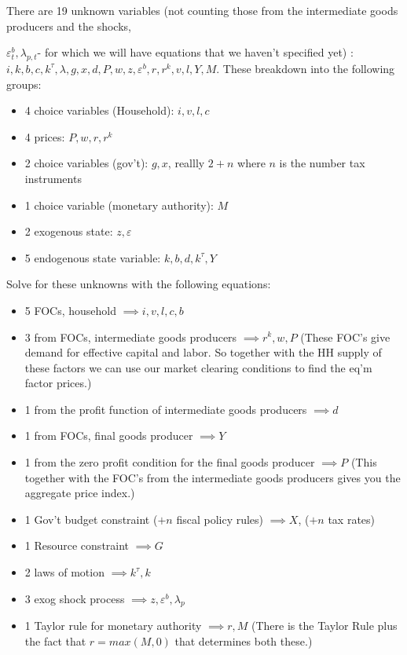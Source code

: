 \documentclass[article,11pt,letterpaper,fleqn]{article}
\theoremstyle{definition}
\numberwithin{equation}{section}
\begin{document}
There are 19 unknown variables (not counting those from the intermediate goods producers and the shocks, {$\varepsilon_{t}^{b},\lambda_{p,t}$- for which we will have equations that we haven't specified yet) : $i, k, b, c, k^{\tau}, \lambda, g, x, d, P, w, z, \varepsilon^{b}, r, r^{k}, v, l, Y, M$.  These breakdown into the following groups:
\begin{itemize}
\item 4 choice variables (Household): $i,v,l,c$
\item 4 prices: $P,w,r,r^{k}$
\item 2 choice variables (gov't): $g,x$, reallly $2+n$ where $n$ is the number tax instruments
\item 1 choice variable (monetary authority): $M$
\item 2 exogenous state: $z,\varepsilon$
\item 5 endogenous state variable: $k,b,d,k^{\tau},Y$
\end{itemize}

Solve for these unknowns with the following equations:
\begin{itemize}
\item 5 FOCs, household $\implies i,v,l,c,b$
\item 3 from FOCs, intermediate goods producers $\implies r^{k},w,P$ (These FOC's give demand for effective capital and labor.  So together with the HH supply of these factors we can use our market clearing conditions to find the eq'm factor prices.)
\item 1 from the profit function of intermediate goods producers $\implies d$
\item 1 from FOCs, final goods producer $\implies Y$
\item 1 from the zero profit condition for the final goods producer $\implies P$ (This together with the FOC's from the intermediate goods producers gives you the aggregate price index.)
\item 1 Gov't budget constraint ($+n$ fiscal policy rules) $\implies X$, ($+n$ tax rates)
\item 1 Resource constraint $\implies G$
\item 2 laws of motion $\implies k^{\tau},k$
\item 3 exog shock process $\implies z,\varepsilon^{b},\lambda_{p}$
\item 1 Taylor rule for monetary authority $\implies r,M$ (There is the Taylor Rule plus the fact that $r=max(M,0)$ that determines both these.)
\end{itemize}

}
\end{document}
